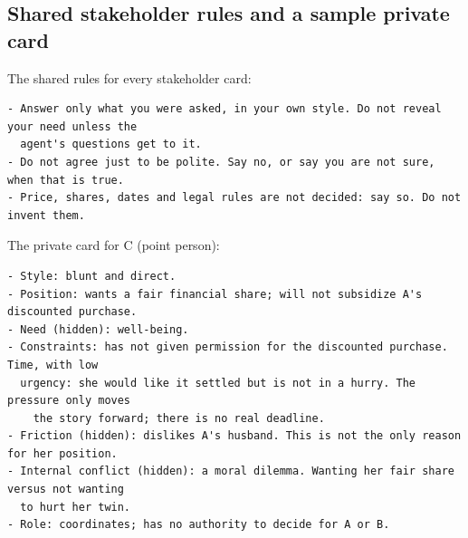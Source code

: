 \subsection{Shared stakeholder rules and a sample private card}
The shared rules for every stakeholder card:
\begin{verbatim}
- Answer only what you were asked, in your own style. Do not reveal your need unless the
  agent's questions get to it.
- Do not agree just to be polite. Say no, or say you are not sure, when that is true.
- Price, shares, dates and legal rules are not decided: say so. Do not invent them.
\end{verbatim}

The private card for C (point person):
\begin{verbatim}
- Style: blunt and direct.
- Position: wants a fair financial share; will not subsidize A's discounted purchase.
- Need (hidden): well-being.
- Constraints: has not given permission for the discounted purchase. Time, with low
  urgency: she would like it settled but is not in a hurry. The pressure only moves
    the story forward; there is no real deadline.
- Friction (hidden): dislikes A's husband. This is not the only reason for her position.
- Internal conflict (hidden): a moral dilemma. Wanting her fair share versus not wanting
  to hurt her twin.
- Role: coordinates; has no authority to decide for A or B.
\end{verbatim}

